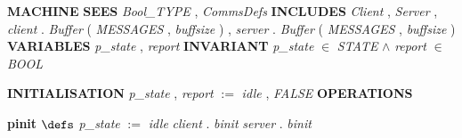 %
\bsetindent
\begin{tabbing}
\bSetTabs
%
%
\bbnl
{\bf MACHINE} \bhsp{} \-\label{Protocol}
%
%
\bbnl
{\bf SEES} \+ \bbnl
{\em Bool\_TYPE\/}\label{Bool_TYPE}  , {\em CommsDefs\/}\label{CommsDefs}  \-
%
%
\bbnl
{\bf INCLUDES} \+ \bbnl
{\em Client\/}\label{Client}  , {\em Server\/}\label{Server}  , \bnl
{\em client\/} . {\em Buffer\/}\label{Buffer}  ( {\em MESSAGES\/}\label{MESSAGES}  , {\em buffsize\/}\label{buffsize}  )  , \bnl
{\em server\/} . {\em Buffer\/}\label{Buffer}  ( {\em MESSAGES\/}\label{MESSAGES}  , {\em buffsize\/}\label{buffsize}  )  \-
%
%
\bbnl
{\bf VARIABLES} \+ \bbnl
{\em p\_state\/}\label{p_state}  , {\em report\/}\label{report}  \-
%
%
\bbnl
{\bf INVARIANT} \+ \bbnl
{\em p\_state\/} $\in$ {\em STATE\/}\label{STATE}  $\wedge$ \bnl
{\em report\/} $\in$ {\em BOOL\/}\label{BOOL}
\end{tabbing}
\bresetindent
%
%
\vspace{-4.5ex}\bsetindent
\begin{tabbing}
\bSetTabs
\+\> \-
%
%
\bbnl
{\bf INITIALISATION} \+ \bbnl
{\em p\_state\/} , {\em report\/} $:=$  {\em idle\/} , {\em FALSE\/} \-
%
%
\bnl\bnl
{\bf OPERATIONS} \+ \bbnl

%
%
{\bf { pinit}}  \bhsp $\defs$ \+ \bnl
  \+\bnl
{\em p\_state\/} $:=$  {\em idle\/} \bparallel \bnl
{\em client\/} . {\em binit\/}\label{binit}  \bparallel \bnl
{\em server\/} . {\em binit\/}\label{binit}  \-\bnl
{}  \- \bOperationSemiColon 
\end{tabbing}
\bresetindent
%
